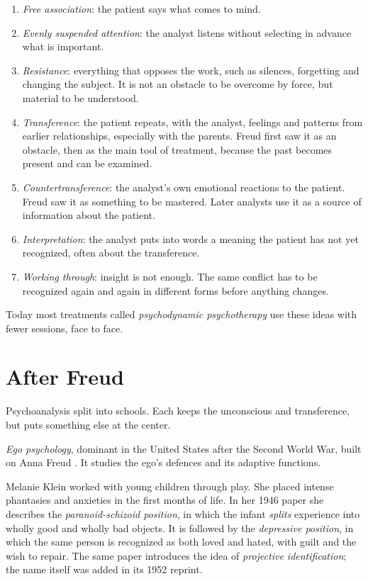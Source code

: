 \begin{enumerate}
\item \emph{Free association}: the
patient says what comes to mind.
\item \emph{Evenly suspended
attention}: the analyst listens without
selecting in advance what is important.
\item \emph{Resistance}: everything that
opposes the work, such as silences,
forgetting and changing the subject. It
is not an obstacle to be overcome by
force, but material to be understood.
\item \emph{Transference}: the patient
repeats, with the analyst, feelings and
patterns from earlier relationships,
especially with the parents. Freud
first saw it as an obstacle, then as
the main tool of treatment, because the
past becomes present and can be
examined.
\item \emph{Countertransference}: the
analyst's own emotional reactions to
the patient. Freud saw it as something
to be mastered. Later analysts use it
as a source of information about the
patient.
\item \emph{Interpretation}: the analyst
puts into words a meaning the patient
has not yet recognized, often about the
transference.
\item \emph{Working through}: insight is
not enough. The same conflict has to be
recognized again and again in different
forms before anything changes.
\end{enumerate}

Today most treatments called
\emph{psychodynamic psychotherapy} use
these ideas with fewer sessions, face
to face.

\section{After Freud}
\label{section-after-freud}

Psychoanalysis split into schools. Each
keeps the unconscious and transference,
but puts something else at the center.

\emph{Ego psychology}, dominant in the
United States after the Second World
War, built on Anna Freud
\cite{anna-freud-ego-defence}. It
studies the ego's defences and its
adaptive functions.

Melanie Klein worked with young children
through play. She placed intense
phantasies and anxieties in the first
months of life. In her 1946 paper
\cite{klein-schizoid-1946} she describes
the \emph{paranoid-schizoid position},
in which the infant \emph{splits}
experience into wholly good and wholly
bad objects. It is followed by the
\emph{depressive position}, in which the
same person is recognized as both loved
and hated, with guilt and the wish to
repair. The same paper introduces the
idea of \emph{projective
identification}; the name itself was
added in its 1952 reprint.

